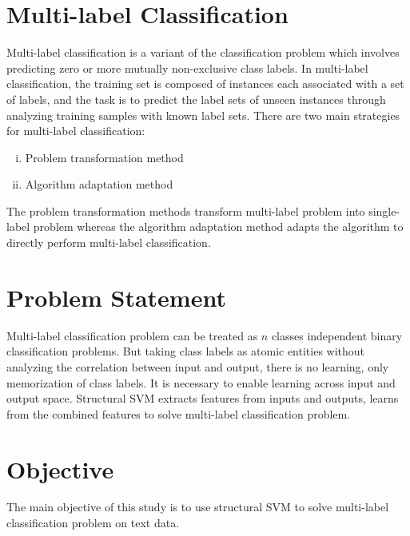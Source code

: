 \section{Multi-label Classification}
Multi-label classification is a variant of the classification problem which involves predicting zero or more mutually non-exclusive class labels. In multi-label classification, the training set is composed of instances each associated with a set of labels, and the task is to predict the label sets of unseen instances through analyzing training samples with known label sets. There are two main strategies for multi-label classification:
\begin{enumerate}[i.]
\item Problem transformation method
\item Algorithm adaptation method
\end{enumerate}
The problem transformation methods transform multi-label problem into single-label problem whereas the algorithm adaptation method adapts the algorithm to directly perform multi-label classification.

\section{Problem Statement}
Multi-label classification problem can be treated as $n$ classes independent binary classification problems. But taking class labels as atomic entities without analyzing the correlation between input and output, there is no learning, only memorization of class labels. It is necessary to enable learning across input and output space. Structural SVM extracts features from inputs and outputs, learns from the combined features to solve multi-label classification problem.

\section{Objective}
The main objective of this study is to use structural SVM to solve multi-label classification problem on text data.
